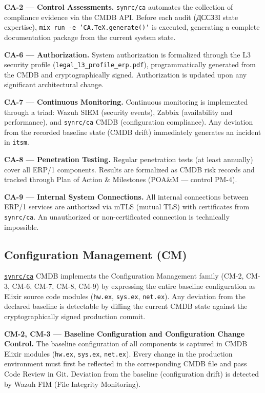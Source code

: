 \documentclass{article}
\begin{document}
\textbf{CA-2 --- Control Assessments.}
\texttt{synrc/ca} automates the collection of compliance evidence via the CMDB API. Before each audit (\foreignlanguage{ukrainian}{ДССЗЗІ} state expertise), \texttt{mix run -e 'CA.TeX.generate()'} is executed, generating a complete documentation package from the current system state.

\textbf{CA-6 --- Authorization.}
System authorization is formalized through the L3 security profile (\texttt{legal\_l3\_profile\_erp.pdf}), programmatically generated from the CMDB and cryptographically signed. Authorization is updated upon any significant architectural change.

\textbf{CA-7 --- Continuous Monitoring.}
Continuous monitoring is implemented through a triad: Wazuh SIEM (security events), Zabbix (availability and performance), and \texttt{synrc/ca} CMDB (configuration compliance). Any deviation from the recorded baseline state (CMDB drift) immediately generates an incident in \texttt{itsm}.

\textbf{CA-8 --- Penetration Testing.}
Regular penetration tests (at least annually) cover all ERP/1 components. Results are formalized as CMDB risk records and tracked through Plan of Action \& Milestones (POA\&M --- control PM-4).

\textbf{CA-9 --- Internal System Connections.}
All internal connections between ERP/1 services are authorized via mTLS (mutual TLS) with certificates from \texttt{synrc/ca}. An unauthorized or non-certificated connection is technically impossible.

\subsection{Configuration Management (CM)}

\href{https://github.com/synrc/ca}{\texttt{synrc/ca}} CMDB implements the Configuration Management family (CM-2, CM-3, CM-6, CM-7, CM-8, CM-9) by expressing the entire baseline configuration as Elixir source code modules (\texttt{hw.ex}, \texttt{sys.ex}, \texttt{net.ex}). Any deviation from the declared baseline is detectable by diffing the current CMDB state against the cryptographically signed production commit.

\textbf{CM-2, CM-3 --- Baseline Configuration and Configuration Change Control.}
The baseline configuration of all components is captured in CMDB Elixir modules (\texttt{hw.ex}, \texttt{sys.ex}, \texttt{net.ex}). Every change in the production environment must first be reflected in the corresponding CMDB file and pass Code Review in Git. Deviation from the baseline (configuration drift) is detected by Wazuh FIM (File Integrity Monitoring).
\end{document}
